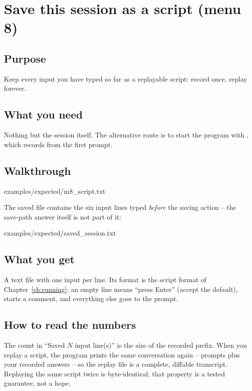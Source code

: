 \chapter{Save this session as a script (menu 8)}
\label{ch:menu8}

\section{Purpose}

Keep every input you have typed so far as a replayable script: record once,
replay forever.

\section{What you need}

Nothing but the session itself. The alternative route is to start the program
with , which records from the first prompt.

\section{Walkthrough}


  {examples/expected/m8_script.txt}

The saved file contains the six input lines typed \emph{before} the saving
action -- the save-path answer itself is not part of it:


  {examples/expected/saved_session.txt}

\section{What you get}

A text file with one input per line. Its format is the script format of
Chapter~\ref{ch:running}: an empty line means ``press Enter'' (accept the
default), \code{\#} starts a comment, and everything else goes to the prompt.

\section{How to read the numbers}

\begin{readbox}
The count in ``Saved $N$ input line(s)'' is the size of the recorded prefix.
When you replay a script, the program prints the same conversation again --
prompts plus your recorded answers -- so the replay file is a complete,
diffable transcript. Replaying the same script twice is byte-identical; that
property is a tested guarantee, not a hope.
\end{readbox}

